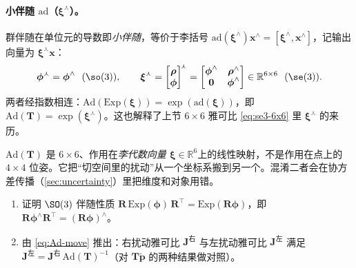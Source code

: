 \paragraph{小伴随 $\mathrm{ad}$（$\boldsymbol{\xi}^\curlywedge$）。}群伴随在单位元的导数即\emph{小伴随}，等价于李括号 $\mathrm{ad}(\boldsymbol{\xi}^\wedge)\mathbf{x}^\wedge=[\boldsymbol{\xi}^\wedge,\mathbf{x}^\wedge]$，记输出向量为 $\boldsymbol{\xi}^\curlywedge\mathbf{x}$：
\begin{equation}
  \boldsymbol{\phi}^\curlywedge=\boldsymbol{\phi}^\wedge\ \ (\so(3)),\qquad
  \boldsymbol{\xi}^\curlywedge=\begin{bmatrix}\boldsymbol{\rho}\\\boldsymbol{\phi}\end{bmatrix}^{\!\curlywedge}=\begin{bmatrix}\boldsymbol{\phi}^\wedge&\boldsymbol{\rho}^\wedge\\\mathbf{0}&\boldsymbol{\phi}^\wedge\end{bmatrix}\in\mathbb{R}^{6\times6}\ \ (\se(3)).
  \label{eq:ad}
\end{equation}
两者经指数相连：$\mathrm{Ad}(\mathrm{Exp}(\boldsymbol{\xi}))=\exp(\mathrm{ad}(\boldsymbol{\xi}))$，即 $\mathrm{Ad}(\mathbf{T})=\exp(\boldsymbol{\xi}^\curlywedge)$。这也解释了上节 $6\times6$ 雅可比 \cref{eq:se3-6x6} 里 $\boldsymbol{\xi}^\curlywedge$ 的来历。

\begin{pitfall}
$\mathrm{Ad}(\mathbf{T})$ 是 $6\times6$、作用在\emph{李代数向量 $\boldsymbol{\xi}\in\mathbb{R}^6$}上的线性映射，不是作用在点上的 $4\times4$ 位姿。它把“切空间里的扰动”从一个坐标系搬到另一个。混淆二者会在协方差传播（\cref{sec:uncertainty}）里把维度和对象用错。
\end{pitfall}

\begin{practice}
\begin{enumerate}
  \item 证明 $\SO(3)$ 伴随性质 $\mathbf{R}\,\mathrm{Exp}(\boldsymbol{\phi})\,\mathbf{R}^\top=\mathrm{Exp}(\mathbf{R}\boldsymbol{\phi})$，即 $\mathbf{R}\boldsymbol{\phi}^\wedge\mathbf{R}^\top=(\mathbf{R}\boldsymbol{\phi})^\wedge$。
  \item 由 \cref{eq:Ad-move} 推出：右扰动雅可比 $\mathbf{J}^{\text{右}}$ 与左扰动雅可比 $\mathbf{J}^{\text{左}}$ 满足 $\mathbf{J}^{\text{左}}=\mathbf{J}^{\text{右}}\,\mathrm{Ad}(\mathbf{T})^{-1}$（对 $\mathbf{T}\tilde{\mathbf{p}}$ 的两种结果做对照）。
\end{enumerate}
\end{practice}

